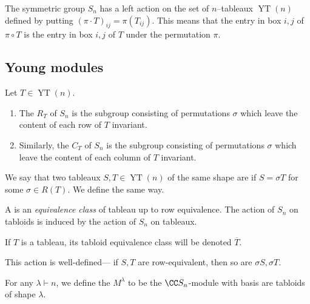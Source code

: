 \documentclass{article}
\DeclareMathOperator{\YT}{YT}
\begin{document}
\begin{definition}
    The symmetric group $S_n$ has a left action on the set of $n$--tableaux $\YT(n)$ defined by putting $(\pi \cdot T)_{ij} = \pi (T_{ij})$.
    This means that the entry in box $i,j$ of $\pi \circ T$ is the entry in box $i,j$ of $T$ under the permutation $\pi$.
\end{definition}

\subsection{Young modules}

\begin{definition}
    Let $T \in \YT(n)$.
    \begin{enumerate}[label=(\alph*)]
        \item 
    The  $R_T$ of $S_n$ is the subgroup consisting of permutations $\sigma$ which leave the content of each row of $T$ invariant.
        \item 
            Similarly, the  $C_T$ of $S_n$ is the subgroup consisting of permutations $\sigma$ which leave the content of each column of $T$ invariant.
    \end{enumerate}
\end{definition}

\begin{definition}
    We say that two tableaux $S,T \in \YT(n)$ of the same shape are  if $S = \sigma T$ for some $\sigma \in R(T)$.
    We define  the same way.
\end{definition}


\begin{definition}
    A  is an \textit{equivalence class} of tableau up to row equivalence.
    The action of $S_n$ on tabloids is induced by the action of $S_n$ on tableaux.

    If $T$ is a tableau, its tabloid equivalence class will be denoted $\overline{T}$.
\end{definition}

This action is well-defined--- if $S,T$ are row-equivalent, then so are $\sigma S, \sigma T$.

\begin{definition}
    For any $\lambda \vdash n$, we define the  $M^\lambda$ to be the $\CC S_n$-module with basis are tabloids of shape $\lambda$.
\end{definition}
\end{document}
